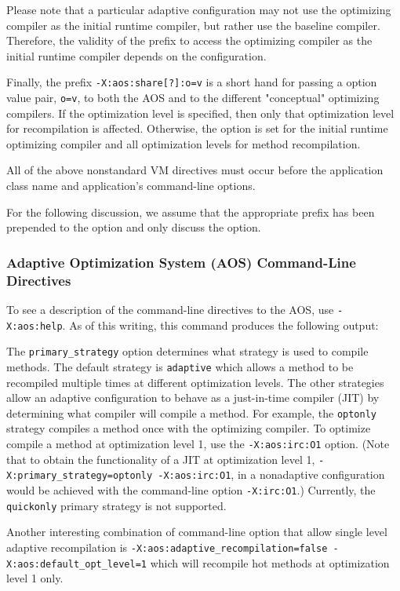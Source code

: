 Please note that a particular adaptive configuration may not use the 
optimizing compiler as the initial runtime compiler, but rather use the 
baseline compiler.
Therefore, the validity of the prefix to access the optimizing compiler
as the initial runtime compiler depends on the configuration.

Finally, the prefix {\tt -X:aos:share[?]:o=v} is a short hand for passing a
option value pair, {\tt o=v}, to both the AOS and to the different "conceptual"
optimizing compilers.  If the optimization level is specified, then only that 
optimization level for recompilation is affected.  Otherwise, the option is set
for the initial runtime optimizing compiler and all optimization levels for
method recompilation.

All of the above nonstandard VM directives must occur before 
the application class name and application's command-line options.

For the following discussion, we assume that the appropriate prefix has been
prepended to the option and only discuss the option.

\subsubsection{Adaptive Optimization System (AOS) Command-Line Directives}

To see a description of the command-line directives to the
AOS, use {\tt -X:aos:help}.
As of this writing, this command produces the following output:



The {\tt primary\_strategy} option determines what strategy is used to compile
methods.
The default strategy is {\tt adaptive} which allows a method to be
recompiled multiple times at different optimization levels.
The other strategies allow an adaptive configuration to behave as a
just-in-time compiler (JIT) by determining what compiler will compile a method.
For example, the {\tt optonly} strategy compiles a method once with the 
optimizing compiler.  To optimize compile a method at optimization level 1,
use the {\tt -X:aos:irc:O1} option.
(Note that to obtain the functionality of a JIT at optimization level 1, 
{\tt -X:primary\_strategy=optonly -X:aos:irc:O1}, in a nonadaptive configuration
would be achieved with the command-line option {\tt -X:irc:O1}.)
Currently, the {\tt quickonly} primary strategy is not supported.


Another interesting combination of command-line option that allow single level
adaptive recompilation is 
{\tt -X:aos:adaptive\_recompilation=false -X:aos:default\_opt\_level=1} 
which will recompile hot methods at optimization level 1 only.

